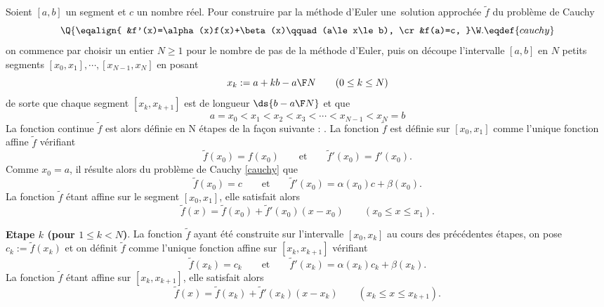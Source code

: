 \noindent
Soient $[a,b]$ un segment et $c$ un nombre réel. Pour construire par la méthode d'Euler une~solution approchée $\tilde f$ du problème de Cauchy
$$
\Q\{\eqalign{
&f'(x)=\alpha(x)f(x)+\beta(x)\qquad(a\le x\le b),
\cr
&f(a)=c, 
}\W.\eqdef{cauchy}
$$
on commence par choisir un entier $N\ge1$ pour le nombre de pas de la méthode d'Euler, 
puis on découpe l'intervalle $[a,b]$ en $N$ petits segments $[x_0,x_1],\cdots,[x_{N-1},x_N]$ en posant 
$$
x_k:=a+k{b-a\F N}\qquad (0\le k\le N)
$$
de sorte que chaque segment $[x_k,x_{k+1}]$ est de longueur $\ds{b-a\F N}$ et que 
$$
a=x_0<x_1<x_2<x_3<\cdots<x_{N-1}<x_N=b
$$
La fonction continue $\tilde f$ est alors définie en N étapes de la fa\c con suivante : \medskip\noindent
{}. La fonction $\tilde f$ est définie sur $[x_0,x_1]$ comme l'unique fonction affine $\tilde f$ vérifiant 
$$
\tilde f(x_0)=f(x_0)\qquad\mbox{et}\qquad \tilde f'(x_0)=f'(x_0). 
$$
Comme $x_0=a$, il résulte alors du problème de Cauchy \eqref{cauchy} que 
$$
\tilde f(x_0)=c\qquad\mbox{et}\qquad\tilde f'(x_0)=\alpha(x_0)c+\beta(x_0).
$$ 
La fonction $\tilde f$ étant affine sur le segment $[x_0,x_1]$, elle satisfait alors 
$$
\tilde f(x)=\tilde f(x_0)+\tilde f'(x_0)(x-x_0)\qquad (x_0\le x\le x_1).
$$

\medskip
\noindent
{\bf Etape $k$ (pour $1\le k<N$)}. La fonction $\tilde f$ ayant été construite sur l'intervalle $[x_0,x_k]$ au cours des précédentes étapes, 
on pose $c_k:=\tilde f(x_k)$ et on définit $\tilde f$ comme l'unique fonction affine sur $[x_k,x_{k+1}]$ vérifiant 
$$
\tilde f(x_k)=c_k\qquad\mbox{et}\qquad \tilde f'(x_k)=\alpha(x_k)c_k+\beta(x_k). 
$$
La fonction $\tilde f$ étant affine sur $[x_k,x_{k+1}]$, elle satisfait alors 
$$
\tilde f(x)=\tilde f(x_k)+\tilde f'(x_k)(x-x_k)\qquad (x_k\le x\le x_{k+1}).
$$



